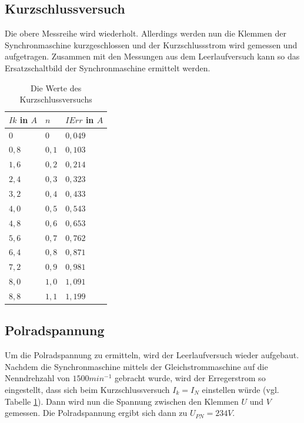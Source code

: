 \documentclass{report}
\begin{document}
\subsection{Kurzschlussversuch}
Die obere Messreihe wird wiederholt. Allerdings werden nun die Klemmen der Synchronmaschine kurzgeschlossen und der Kurzschlussstrom wird gemessen und aufgetragen. Zusammen mit den Messungen aus dem Leerlaufversuch kann so das Ersatzschaltbild der Synchronmaschine ermittelt werden.
\begin{table}[!ht]
	\centering
	\begin{tabular}{lll}
		\hline
		$Ik$ in $A$ & $n$   & $IErr$ in $A$ \\ \hline
		$0$         & $0$   & $0,049$       \\
		$0,8$       & $0,1$ & $0,103$       \\
		$1,6$       & $0,2$ & $0,214$       \\
		$2,4$       & $0,3$ & $0,323$       \\
		$3,2$       & $0,4$ & $0,433$       \\
		$4,0$       & $0,5$ & $0,543$       \\
		$4,8$       & $0,6$ & $0,653$       \\
		$5,6$       & $0,7$ & $0,762$       \\
		$6,4$       & $0,8$ & $0,871$       \\
		$7,2$       & $0,9$ & $0,981$       \\
		$8,0$       & $1,0$ & $1,091$       \\
		$8,8$       & $1,1$ & $1,199$       \\ \hline
	\end{tabular}
	\caption{Die Werte des Kurzschlussversuchs}
	\label{tab:kurzschlussversuch}
\end{table}

\subsection{Polradspannung}
\label{sec:polradspannung}

Um die Polradspannung zu ermitteln, wird der Leerlaufversuch wieder aufgebaut. Nachdem die Synchronmaschine mittels der Gleichstrommaschine auf die Nenndrehzahl von $1500min^{-1}$ gebracht wurde, wird der Erregerstrom so eingestellt, dass sich beim Kurzschlussversuch $I_{k} = I_{N}$ einstellen würde (vgl. Tabelle \ref{tab:kurzschlussversuch}). Dann wird nun die Spannung zwischen den Klemmen $U$ und $V$ gemessen. Die Polradspannung ergibt sich dann zu $U_{PN} = 234V$.
\end{document}
